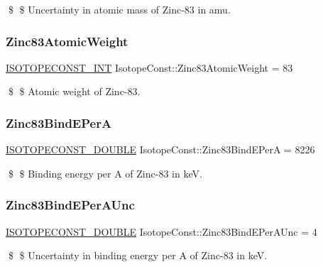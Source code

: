\$ \$ Uncertainty in atomic mass of Zinc-\/83 in amu. \mbox{\label{group___isotope_const-_zinc-_zn83_gae5f1b0f3eed0ad47084f6809f47c3b41}} 
\subsubsection{\texorpdfstring{Zinc83\+Atomic\+Weight}{Zinc83AtomicWeight}}
{\footnotesize\ttfamily \mbox{\hyperlink{group___isotope_const-_macros_ga5f18360b3e99483a35c32d789e62621c}{I\+S\+O\+T\+O\+P\+E\+C\+O\+N\+S\+T\+\_\+\+I\+NT}} Isotope\+Const\+::\+Zinc83\+Atomic\+Weight = 83}

\$ \$ Atomic weight of Zinc-\/83. \mbox{\label{group___isotope_const-_zinc-_zn83_ga95eb83e77d84d9a9df90d3df9ec6aead}} 
\subsubsection{\texorpdfstring{Zinc83\+Bind\+E\+PerA}{Zinc83BindEPerA}}
{\footnotesize\ttfamily \mbox{\hyperlink{group___isotope_const-_macros_ga8f45a7272ce02c0b4c65c44636ed719a}{I\+S\+O\+T\+O\+P\+E\+C\+O\+N\+S\+T\+\_\+\+D\+O\+U\+B\+LE}} Isotope\+Const\+::\+Zinc83\+Bind\+E\+PerA = 8226}

\$ \$ Binding energy per A of Zinc-\/83 in keV. \mbox{\label{group___isotope_const-_zinc-_zn83_ga09b1b0e6e8d05089570873f835684333}} 
\subsubsection{\texorpdfstring{Zinc83\+Bind\+E\+Per\+A\+Unc}{Zinc83BindEPerAUnc}}
{\footnotesize\ttfamily \mbox{\hyperlink{group___isotope_const-_macros_ga8f45a7272ce02c0b4c65c44636ed719a}{I\+S\+O\+T\+O\+P\+E\+C\+O\+N\+S\+T\+\_\+\+D\+O\+U\+B\+LE}} Isotope\+Const\+::\+Zinc83\+Bind\+E\+Per\+A\+Unc = 4}

\$ \$ Uncertainty in binding energy per A of Zinc-\/83 in keV. \mbox{\label{group___isotope_const-_zinc-_zn83_ga86cc45faef6a5d035f3671b71a95e87b}} 
